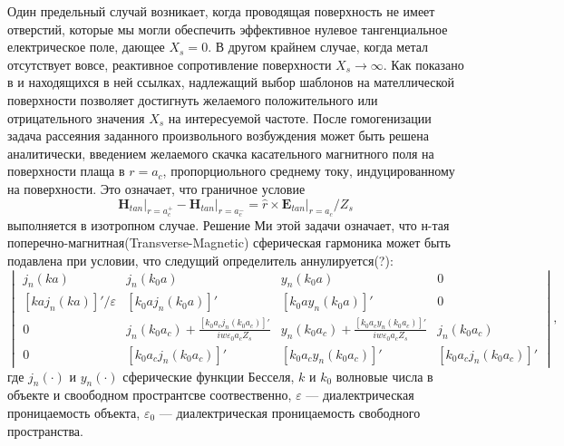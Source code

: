 \documentclass[12pt,a4paper]{article}
\begin{document}
Один предельный случай возникает, когда проводящая поверхность не имеет отверстий, которые мы могли
обеспечить эффективное нулевое тангенциальное електрическое поле, дающее $X_s = 0$. В другом крайнем
случае, когда метал отсутствует вовсе, реактивное сопротивление поверхности $X_s \to \infty$.
Как показано в \cite{14} и находящихся в ней ссылках, надлежащий выбор шаблонов на мателлической
поверхности позволяет достигнуть желаемого положительного или отрицательного значения $X_s$ на 
интересуемой частоте. После гомогенизации задача рассеяния заданного произвольного возбуждения может
быть решена аналитически, введением желаемого скачка касательного магнитного поля на поверхности плаща
в $r=a_c$, пропорциольного среднему току, индуцированному на поверхности. Это означает, что граничное
условие 
\begin{equation}
\left.\textbf{H}_{tan}\right|_{r=a_c^+} - \left.\textbf{H}_{tan}\right|_{r=a_c^-} = 
\hat{r} \times \left.\textbf{E}_{tan}\right|_{r=a_c} / Z_s
\end{equation} 	
выполняется в изотропном случае. Решение Ми этой задачи означает, что н-тая 
поперечно-магнитная(Transverse-Magnetic) сферическая гармоника может быть подавлена при условии,
что следущий определитель аннулируется(?):
\begin{equation}
\begin{vmatrix}
j_n(ka) & j_n(k_0a) & y_n(k_0a) & 0\\
[kaj_n(ka)]'/\varepsilon & [k_0aj_n(k_0a)]' & [k_0ay_n(k_0a)]' & 0\\
0 & j_n(k_0a_c)+\frac{[k_0a_cj_n(k_0a_c)]'}{iw\varepsilon_0a_cZ_s} &
y_n(k_0a_c) + \frac{[k_0a_cy_n(k_0a_c)]'}{iw\varepsilon_0a_cZ_s} & j_n(k_0a_c)\\
0 & [k_0a_cj_n(k_0a_c)]' & [k_0a_cy_n(k_0a_c)]' & [k_0a_cj_n(k_0a_c)]'
\end{vmatrix},
\end{equation}
где $j_n(\cdot)$ и $y_n(\cdot)$ сферические функции Бесселя, $k$ и $k_0$ волновые числа в объекте и
своободном пространтсве соотвественно, $\varepsilon$ --- диалектрическая проницаемость объекта,
$\varepsilon_0$ --- диалектрическая проницаемость свободного пространства.
\end{document}
